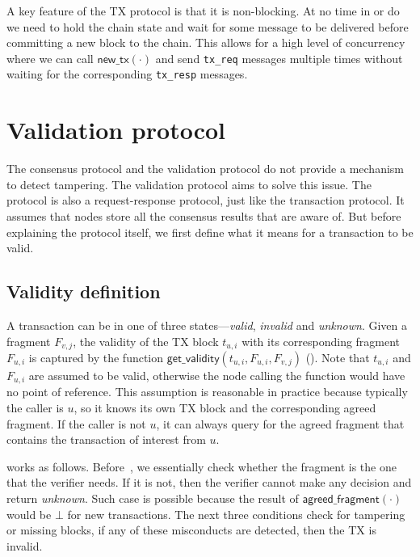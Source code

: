 A key feature of the TX protocol is that it is non-blocking.
At no time in  or  do we need to hold the chain state and wait for some message to be delivered before committing a new block to the chain.
This allows for a high level of concurrency where we can call $\textsf{new\_tx}(\cdot)$ and send \texttt{tx\_req} messages multiple times without waiting for the corresponding \texttt{tx\_resp} messages.

\section{Validation protocol}
\label{sec:vd-protocol}

The consensus protocol and the validation protocol do not provide a mechanism to detect tampering.
The validation protocol aims to solve this issue.
The protocol is also a request-response protocol, just like the transaction protocol.
It assumes that nodes store all the consensus results that are aware of.
But before explaining the protocol itself, we first define what it means for a transaction to be valid.

\subsection{Validity definition}
A transaction can be in one of three states---\emph{valid}, \emph{invalid} and \emph{unknown}.
Given a fragment $F_{v, j}$, the validity of the TX block $t_{u, i}$ with its corresponding fragment $F_{u, i}$ is captured by the function $\textsf{get\_validity}(t_{u, i}, F_{u, i}, F_{v, j})$ ().
Note that $t_{u, i}$ and $F_{u, i}$ are assumed to be valid,
otherwise the node calling the function would have no point of reference.
This assumption is reasonable in practice because typically the caller is $u$,
so it knows its own TX block and the corresponding agreed fragment.
If the caller is not $u$, it can always query for the agreed fragment that contains the transaction of interest from $u$.

 works as follows.
Before~,
we essentially check whether the fragment is the one that the verifier needs.
If it is not, then the verifier cannot make any decision and return \emph{unknown}.
Such case is possible because the result of $\textsf{agreed\_fragment}(\cdot)$ would be $\bot$ for new transactions.
The next three conditions check for tampering or missing blocks, if any of these misconducts are detected, then the TX is invalid.

